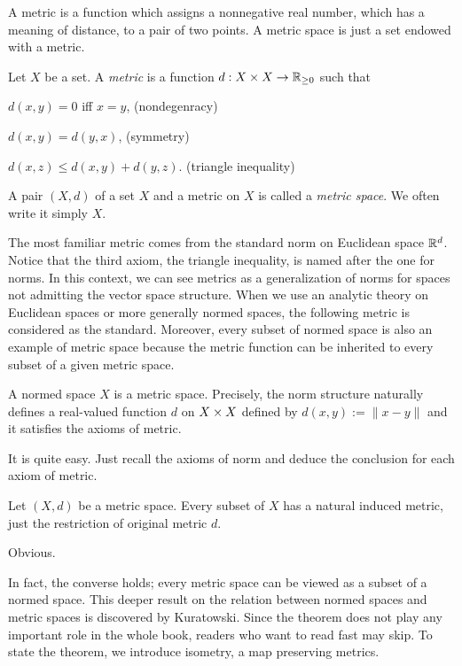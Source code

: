 \documentclass{../crs}
\begin{document}
A metric is a function which assigns a nonnegative real number, which has a meaning of distance, to a pair of two points.
A metric space is just a set endowed with a metric.

\begin{defn}
Let $X$ be a set.
A \emph{metric} is a function $d:X\x X\to\R_{\ge0}$ such that
\begin{cond}
\item $d(x,y)=0$ iff $x=y$, \hfill(nondegenracy)
\item $d(x,y)=d(y,x)$, \hfill(symmetry)
\item $d(x,z)\le d(x,y)+d(y,z)$. \hfill(triangle inequality)
\end{cond}
A pair $(X,d)$ of a set $X$ and a metric on $X$ is called a \emph{metric space}.
We often write it simply $X$.
\end{defn}

The most familiar metric comes from the standard norm on Euclidean space $\mathbb{R}^d$.
Notice that the third axiom, the triangle inequality, is named after the one for norms.
In this context, we can see metrics as a generalization of norms for spaces not admitting the vector space structure.
When we use an analytic theory on Euclidean spaces or more generally normed spaces, the following metric is considered as the standard.
Moreover, every subset of normed space is also an example of metric space because the metric function can be inherited to every subset of a given metric space.

\begin{ex}
A normed space $X$ is a metric space.
Precisely, the norm structure naturally defines a real-valued function $d$ on $X\times X$ defined by $d(x,y):=\|x-y\|$ and it satisfies the axioms of metric.
\end{ex}
\begin{pf}
It is quite easy.
Just recall the axioms of norm and deduce the conclusion for each axiom of metric.
\end{pf}
\begin{ex}
Let $(X,d)$ be a metric space.
Every subset of $X$ has a natural induced metric, just the restriction of original metric $d$.
\end{ex}
\begin{pf}
Obvious.
\end{pf}

In fact, the converse holds; every metric space can be viewed as a subset of a normed space.
This deeper result on the relation between normed spaces and metric spaces is discovered by Kuratowski.
Since the theorem does not play any important role in the whole book, readers who want to read fast may skip.
To state the theorem, we introduce isometry, a map preserving metrics.
\end{document}

